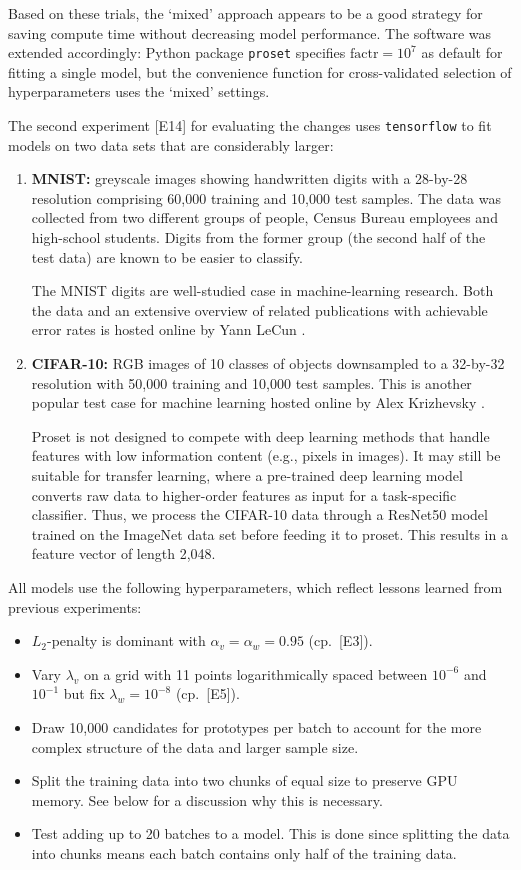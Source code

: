 %
Based on these trials, the `mixed' approach appears to be a good strategy for saving compute time without decreasing model performance.
The software was extended accordingly: Python package \texttt{proset} specifies $\text{factr}=10^7$ as default for fitting a single model, but the convenience function for cross-validated selection of hyperparameters uses the `mixed' settings.\par
%
The second experiment [E14] for evaluating the changes uses \texttt{tensorflow} to fit models on two data sets that are considerably larger:
%
\begin{enumerate}
\item\textbf{MNIST:} greyscale images showing handwritten digits with a 28-by-28 resolution comprising
60,000 training and 10,000 test samples.
The data was collected from two different groups of people, Census Bureau employees and high-school students.
Digits from the former group (the second half of the test data) are known to be easier to classify.\par
%
The MNIST digits are well-studied case in machine-learning research.
Both the data and an extensive overview of related publications with achievable error rates is hosted online by Yann LeCun \cite{LeCun_98}.
%
\item\textbf{CIFAR-10:} RGB images of 10 classes of objects downsampled to a 32-by-32 resolution with 50,000 training and 10,000 test samples.
This is another popular test case for machine learning hosted online by Alex Krizhevsky \cite{Krizhevsky_09}.\par
%
Proset is not designed to compete with deep learning methods that handle features with low information content (e.g., pixels in images).
It may still be suitable for transfer learning, where a pre-trained deep learning model converts raw data to higher-order features as input for a task-specific classifier.
Thus, we process the CIFAR-10 data through a ResNet50 \cite{He_15} model trained on the ImageNet \cite{Russakovsky_15} data set before feeding it to proset.
This results in a feature vector of length 2,048.
\end{enumerate}
%
All models use the following hyperparameters, which reflect lessons learned from previous experiments:
%
\begin{itemize}
\item $L_2$-penalty is dominant with $\alpha_v=\alpha_w=0.95$ (cp.\ [E3]).
%
\item Vary $\lambda_v$ on a grid with 11 points logarithmically spaced between $10^{-6}$ and $10^{-1}$ but fix $\lambda_w=10^{-8}$ (cp.\ [E5]).
%
\item Draw 10,000 candidates for prototypes per batch to account for the more complex structure of the data and larger sample size.
%
\item Split the training data into two chunks of equal size to preserve GPU memory.
See below for a discussion why this is necessary.
%
\item Test adding up to 20 batches to a model.
This is done since splitting the data into chunks means each batch contains only half of the training data.
\end{itemize}
